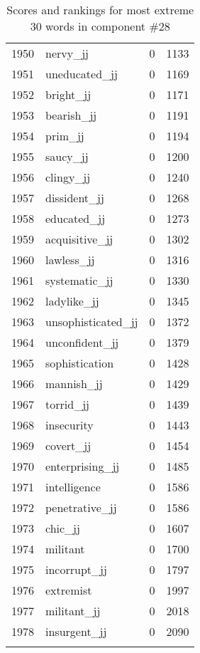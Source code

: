 \begin{longtable}[!htbp]{| rlr@{.}l |}
    1950 & nervy\_jj & 0 & 1133 \\
    1951 & uneducated\_jj & 0 & 1169 \\
    1952 & bright\_jj & 0 & 1171 \\
    1953 & bearish\_jj & 0 & 1191 \\
    1954 & prim\_jj & 0 & 1194 \\
    1955 & saucy\_jj & 0 & 1200 \\
    1956 & clingy\_jj & 0 & 1240 \\
    1957 & dissident\_jj & 0 & 1268 \\
    1958 & educated\_jj & 0 & 1273 \\
    1959 & acquisitive\_jj & 0 & 1302 \\
    1960 & lawless\_jj & 0 & 1316 \\
    1961 & systematic\_jj & 0 & 1330 \\
    1962 & ladylike\_jj & 0 & 1345 \\
    1963 & unsophisticated\_jj & 0 & 1372 \\
    1964 & unconfident\_jj & 0 & 1379 \\
    1965 & sophistication & 0 & 1428 \\
    1966 & mannish\_jj & 0 & 1429 \\
    1967 & torrid\_jj & 0 & 1439 \\
    1968 & insecurity & 0 & 1443 \\
    1969 & covert\_jj & 0 & 1454 \\
    1970 & enterprising\_jj & 0 & 1485 \\
    1971 & intelligence & 0 & 1586 \\
    1972 & penetrative\_jj & 0 & 1586 \\
    1973 & chic\_jj & 0 & 1607 \\
    1974 & militant & 0 & 1700 \\
    1975 & incorrupt\_jj & 0 & 1797 \\
    1976 & extremist & 0 & 1997 \\
    1977 & militant\_jj & 0 & 2018 \\
    1978 & insurgent\_jj & 0 & 2090 \\
    \hline
    \caption{Scores and rankings for most extreme 30 words in component \#28} \\
\end{longtable}

